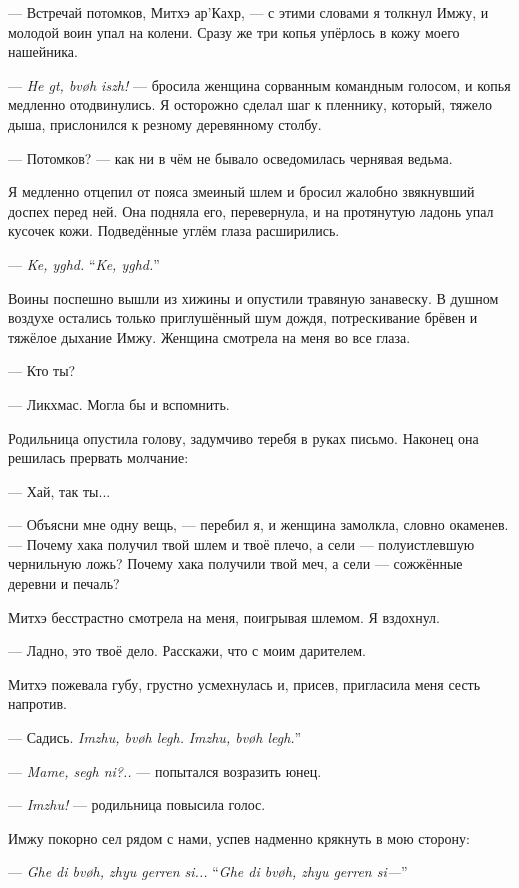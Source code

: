--- Встречай потомков, Митхэ ар’Кахр, --- с этими словами я толкнул Имжу, и молодой воин упал на колени.
Сразу же три копья упёрлось в кожу моего нашейника.

--- \textit{He gt, bv\o{}h iszh!} --- бросила женщина сорванным командным голосом, и копья медленно отодвинулись.
Я осторожно сделал шаг к пленнику, который, тяжело дыша, прислонился к резному деревянному столбу.

--- Потомков? --- как ни в чём не бывало осведомилась чернявая ведьма.

Я медленно отцепил от пояса змеиный шлем и бросил жалобно звякнувший доспех перед ней.
Она подняла его, перевернула, и на протянутую ладонь упал кусочек кожи.
Подведённые углём глаза расширились.

{--- \textit{Ke, yghd.}}
{``\textit{Ke, yghd.}''}

Воины поспешно вышли из хижины и опустили травяную занавеску.
В душном воздухе остались только приглушённый шум дождя, потрескивание брёвен и тяжёлое дыхание Имжу.
Женщина смотрела на меня во все глаза.

--- Кто ты?

--- Ликхмас.
Могла бы и вспомнить.

Родильница опустила голову, задумчиво теребя в руках письмо.
Наконец она решилась прервать молчание:

--- Хай, так ты...

--- Объясни мне одну вещь, --- перебил я, и женщина замолкла, словно окаменев.
--- Почему хака получил твой шлем и твоё плечо, а сели --- полуистлевшую чернильную ложь?
Почему хака получили твой меч, а сели --- сожжённые деревни и печаль?

Митхэ бесстрастно смотрела на меня, поигрывая шлемом. Я вздохнул.

--- Ладно, это твоё дело. Расскажи, что с моим дарителем.

Митхэ пожевала губу, грустно усмехнулась и, присев, пригласила меня сесть напротив.

--- Садись.
{\textit{Imzhu, bv\o h legh.}}
{\textit{Imzhu, bv\o h legh.}''}

--- \textit{Mame, segh ni?..} --- попытался возразить юнец.

--- \textit{Imzhu!} --- родильница повысила голос.

Имжу покорно сел рядом с нами, успев надменно крякнуть в мою сторону:

{--- \textit{Ghe di bv\o{}h, zhyu gerren si...}}
{``\textit{Ghe di bv\o{}h, zhyu gerren si---}''}

